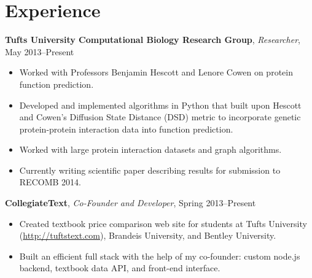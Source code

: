 \documentclass[10pt, letter]{article}
\begin{document}
\section*{Experience}
{\bf Tufts University Computational Biology Research Group}, {\em Researcher}, May 2013--Present\\
\vspace*{-.15in} 
\begin{itemize}[topsep=0pt,itemsep=-1pt]
    \item Worked with Professors Benjamin Hescott and Lenore Cowen on protein function prediction.
    \item Developed and implemented algorithms in Python that built upon Hescott and Cowen's Diffusion State Distance (DSD) metric to incorporate genetic protein-protein interaction data into function prediction.
    \item Worked with large protein interaction datasets and graph algorithms.
    \item Currently writing scientific paper describing results for submission to RECOMB 2014.
\end{itemize}
\vspace{6pt}
{\bf CollegiateText}, {\em Co-Founder and Developer}, Spring 2013--Present\\
\vspace*{-.15in}
\begin{itemize}[topsep=0pt,itemsep=-1pt]
            \item Created textbook price comparison web site for students at Tufts University (\url{http://tuftstext.com}), Brandeis University, and Bentley University.
            \item Built an efficient full stack with the help of my co-founder: custom node.js backend, textbook data API, and front-end interface. 
        \end{itemize}
\end{document}

